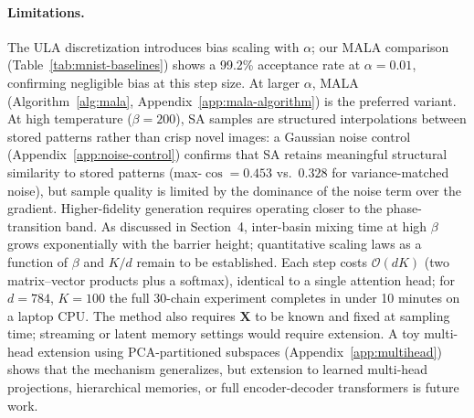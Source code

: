 \paragraph{Limitations.}
The ULA discretization introduces bias scaling with $\alpha$; our MALA comparison (Table~\ref{tab:mnist-baselines}) shows a 99.2\% acceptance rate at $\alpha{=}0.01$, confirming negligible bias at this step size. At larger $\alpha$, MALA (Algorithm~\ref{alg:mala}, Appendix~\ref{app:mala-algorithm}) is the preferred variant. At high temperature ($\beta{=}200$), SA samples are structured interpolations between stored patterns rather than crisp novel images: a Gaussian noise control (Appendix~\ref{app:noise-control}) confirms that SA retains meaningful structural similarity to stored patterns (max-$\cos=0.453$ vs.\ $0.328$ for variance-matched noise), but sample quality is limited by the dominance of the noise term over the gradient. Higher-fidelity generation requires operating closer to the phase-transition band. As discussed in Section~4, inter-basin mixing time at high $\beta$ grows exponentially with the barrier height; quantitative scaling laws as a function of $\beta$ and $K/d$ remain to be established. Each step costs $\mathcal{O}(dK)$ (two matrix--vector products plus a softmax), identical to a single attention head; for $d{=}784$, $K{=}100$ the full 30-chain experiment completes in under 10 minutes on a laptop CPU. The method also requires $\mathbf{X}$ to be known and fixed at sampling time; streaming or latent memory settings would require extension. A toy multi-head extension using PCA-partitioned subspaces (Appendix~\ref{app:multihead}) shows that the mechanism generalizes, but extension to learned multi-head projections, hierarchical memories, or full encoder-decoder transformers is future work.
